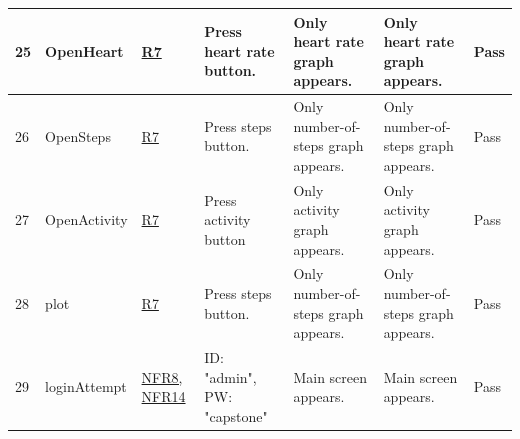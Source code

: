 \documentclass[12pt, titlepage]{article}
\begin{document}
\begin{center}
\begin{table} [H]
\begin{tabular}{ | p{0.5cm} | p{2.8cm} |  p{1.1cm} | p{2.7cm} | p{2.7cm} | p{2.7cm} | p{1.1cm} |}
\hline
25 & OpenHeart & \href{https://github.com/zakerl/Capstone_Project/blob/main/docs/SRS/SRS.pdf}{R7} & Press heart rate button. & Only heart rate graph appears. & Only heart rate graph appears. & Pass \\ 
\hline
26 & OpenSteps & \href{https://github.com/zakerl/Capstone_Project/blob/main/docs/SRS/SRS.pdf}{R7} & Press steps button. & Only number-of-steps graph appears. & Only number-of-steps graph appears. & Pass \\ 
\hline
27 & OpenActivity & \href{https://github.com/zakerl/Capstone_Project/blob/main/docs/SRS/SRS.pdf}{R7} & Press activity button & Only activity graph appears. & Only activity graph appears. & Pass \\ 
\hline
28 & plot & \href{https://github.com/zakerl/Capstone_Project/blob/main/docs/SRS/SRS.pdf}{R7} & Press steps button. & Only number-of-steps graph appears. & Only number-of-steps graph appears. & Pass \\ 
\hline
29 & loginAttempt & \href{https://github.com/zakerl/Capstone_Project/blob/main/docs/SRS/SRS.pdf}{NFR8, NFR14} & ID: "admin", PW: "capstone" & Main screen appears. & Main screen appears. & Pass \\ 
\hline
\end{tabular}
\end{table}
\end{center}
\end{document}
